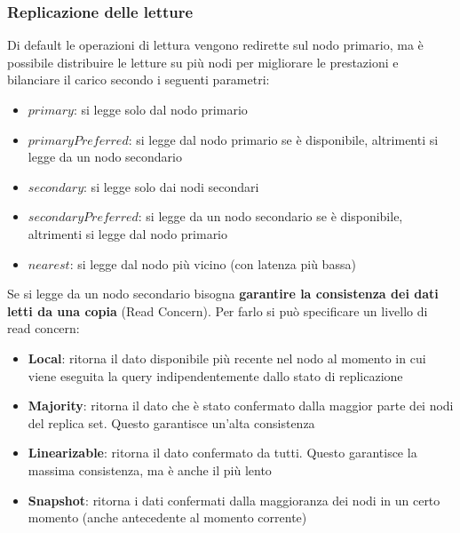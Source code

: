 \documentclass[a4paper]{article}
\begin{document}
\subsubsection{Replicazione delle letture}
Di default le operazioni di lettura vengono redirette sul nodo primario, ma è
possibile distribuire le letture su più nodi per migliorare le prestazioni e bilanciare
il carico secondo i seguenti parametri:
\begin{itemize}
  \item \( primary \): si legge solo dal nodo primario

  \item \( primaryPreferred \): si legge dal nodo primario se è disponibile, altrimenti
    si legge da un nodo secondario

  \item \( secondary \): si legge solo dai nodi secondari

  \item \( secondaryPreferred \): si legge da un nodo secondario se è disponibile,
    altrimenti si legge dal nodo primario

  \item \( nearest \): si legge dal nodo più vicino (con latenza più bassa)
\end{itemize}
Se si legge da un nodo secondario bisogna \textbf{garantire la consistenza dei dati letti
da una copia} (Read Concern). Per farlo si può specificare un livello di read concern:
\begin{itemize}
  \item \textbf{Local}: ritorna il dato disponibile più recente nel nodo al momento in
    cui viene eseguita la query indipendentemente dallo stato di replicazione

  \item \textbf{Majority}: ritorna il dato che è stato confermato dalla maggior parte
    dei nodi del replica set. Questo garantisce un'alta consistenza

  \item \textbf{Linearizable}: ritorna il dato confermato da tutti. Questo garantisce
    la massima consistenza, ma è anche il più lento

  \item \textbf{Snapshot}: ritorna i dati confermati dalla maggioranza dei nodi in
    un certo momento (anche antecedente al momento corrente)
\end{itemize}
\end{document}
